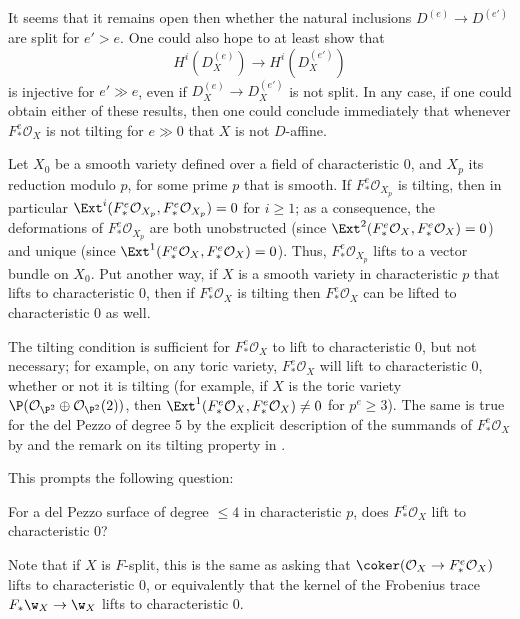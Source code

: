 \documentclass{article}
\def\O{\mathcal O}
\numberwithin{equation}{section}
\theoremstyle{theorem}
\numberwithin{thm}{section}
\theoremstyle{definition}
\begin{document}
It seems that it remains open then whether the natural inclusions $D^{(e)}\to D^{(e')}$ are split for $e'>e$. One could also hope to at least show that 
$$
H^i(D^{(e)}_X)\to H^i(D^{(e')}_X)
$$
is injective for $e'\gg e$, even if $D^{(e)}_X\to D^{(e')}_X$ is not split.
In any case, if one could obtain either of these results, then one could conclude immediately that whenever $F_*^e\O_X$ is not tilting for $e\gg0 $ that $X$ is not $D$-affine.

\begin{rem}
Let $X_0$ be a smooth variety defined over a field of characteristic 0, and $X_p$ its reduction modulo $p$, for some prime $p$ that is smooth. If $F_*^e\O_{X_p}$ is tilting, then in particular $\Ext^i(F_*^e\O_{X_p},F_*^e\O_{X_p})=0$ for $i\geq 1$; as a consequence, the deformations of $F_*^e\O_{X_p}$ are both unobstructed (since $\Ext^2(F_*^e\O_X,F^e_*\O_X)=0$) and unique  (since $\Ext^1(F_*^e\O_X,F^e_*\O_X)=0$). Thus, $F_*^e\O_{X_p}$ lifts to a vector bundle on $X_0$.
Put another way, if $X$ is a smooth variety in characteristic $p$ that lifts to characteristic 0, then if $F_*^e\O_X$ is tilting then $F_*^e\O_X$ can be lifted to characteristic 0 as well.

The tilting condition is sufficient for $F_*^e\O_X$ to lift to characteristic 0, but not necessary; 
for example, on any toric variety, $F_*^e\O_X$ will lift to characteristic 0, whether or not it is tilting (for example, if $X$ is the toric variety $\P(\O_{\P^2}\oplus \O_{\P^2}(2))$, then $\Ext^1(F_*^e\O_X,F_*^e\O_X)\neq 0$  for $p^e\geq 3$). The same is true for the del Pezzo of degree 5 by the explicit description of the summands of $F_*^e\O_X$ by \cite{Hara1} and the remark on its tilting property in .
\end{rem}

This prompts the following question:

\begin{quest}
For a del Pezzo surface of degree $\leq 4$ in characteristic $p$, does $F_*^e\O_X$ lift to characteristic 0?
\end{quest}

Note that if $X$ is $F$-split, this is the same as asking that $\coker(\O_X\to F_*^e\O_X)$ lifts to characteristic 0, or equivalently that the kernel of the Frobenius trace $F_*\w_X\to \w_X$ lifts to characteristic 0.



\end{document}
